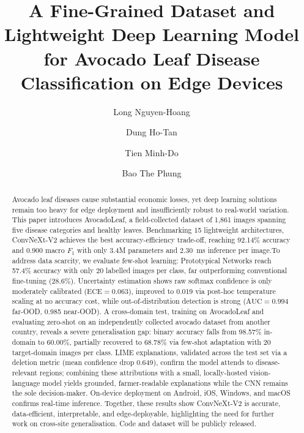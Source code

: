 \begin{frontmatter}

\title{A Fine-Grained Dataset and Lightweight Deep Learning Model for Avocado Leaf Disease Classification on Edge Devices}

\author[uit,vnu]{Long Nguyen-Hoang}
\author[uit,vnu]{Dung Ho-Tan}
\author[uit,vnu,cth]{Tien Minh-Do}
\author[cth]{Bao The Phung}






\begin{abstract}
Avocado leaf diseases cause substantial economic losses, yet deep learning solutions remain too heavy for edge deployment and insufficiently robust to real-world variation. This paper introduces AvocadoLeaf, a field-collected dataset of 1,861 images spanning five disease categories and healthy leaves. Benchmarking 15 lightweight architectures, ConvNeXt-V2 achieves the best accuracy-efficiency trade-off, reaching 92.14\% accuracy and 0.900 macro $F_1$ with only 3.4M parameters and 2.30~ms inference per image.To address data scarcity, we evaluate few-shot learning: Prototypical Networks reach 57.4\% accuracy with only 20 labelled images per class, far outperforming conventional fine-tuning (28.6\%). Uncertainty estimation shows raw softmax confidence is only moderately calibrated ($\text{ECE} = 0.063$), improved to 0.019 via post-hoc temperature scaling at no accuracy cost, while out-of-distribution detection is strong ($\text{AUC} = 0.994$ far-OOD, 0.985 near-OOD). A cross-domain test, training on AvocadoLeaf and evaluating zero-shot on an independently collected avocado dataset from another country, reveals a severe generalisation gap: binary accuracy falls from 98.57\% in-domain to 60.00\%, partially recovered to 68.78\% via few-shot adaptation with 20 target-domain images per class. LIME explanations, validated across the test set via a deletion metric (mean confidence drop 0.649), confirm the model attends to disease-relevant regions; combining these attributions with a small, locally-hosted vision-language model yields grounded, farmer-readable explanations while the CNN remains the sole decision-maker. On-device deployment on Android, iOS, Windows, and macOS confirms real-time inference. Together, these results show ConvNeXt-V2 is accurate, data-efficient, interpretable, and edge-deployable, highlighting the need for further work on cross-site generalisation. Code and dataset will be publicly released.
\end{abstract}


\end{frontmatter}
